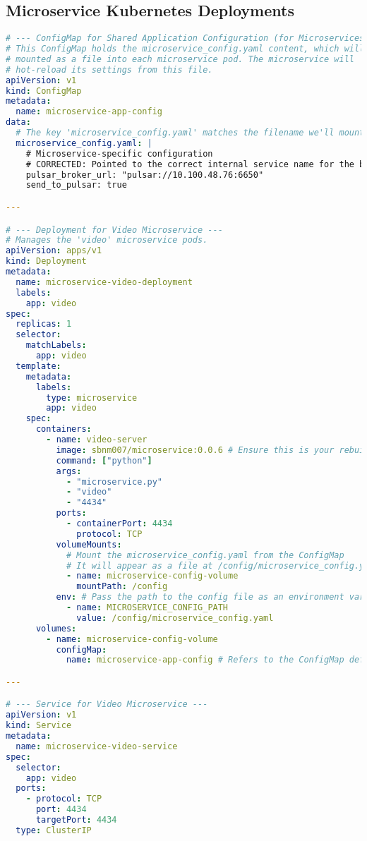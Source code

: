 \subsection{Microservice Kubernetes Deployments}
\begin{lstlisting}[breaklines=true, caption={Microservice Kubernetes Deployments}, language=yaml]
# --- ConfigMap for Shared Application Configuration (for Microservices) ---
# This ConfigMap holds the microservice_config.yaml content, which will be
# mounted as a file into each microservice pod. The microservice will
# hot-reload its settings from this file.
apiVersion: v1
kind: ConfigMap
metadata:
  name: microservice-app-config
data:
  # The key 'microservice_config.yaml' matches the filename we'll mount.
  microservice_config.yaml: |
    # Microservice-specific configuration
    # CORRECTED: Pointed to the correct internal service name for the broker.
    pulsar_broker_url: "pulsar://10.100.48.76:6650"
    send_to_pulsar: true 

---

# --- Deployment for Video Microservice ---
# Manages the 'video' microservice pods.
apiVersion: apps/v1
kind: Deployment
metadata:
  name: microservice-video-deployment
  labels:
    app: video
spec:
  replicas: 1
  selector:
    matchLabels:
      app: video
  template:
    metadata:
      labels:
        type: microservice
        app: video
    spec:
      containers:
        - name: video-server
          image: sbnm007/microservice:0.0.6 # Ensure this is your rebuilt image
          command: ["python"]
          args:
            - "microservice.py"
            - "video"
            - "4434"
          ports:
            - containerPort: 4434
              protocol: TCP
          volumeMounts:
            # Mount the microservice_config.yaml from the ConfigMap
            # It will appear as a file at /config/microservice_config.yaml inside the container.
            - name: microservice-config-volume
              mountPath: /config
          env: # Pass the path to the config file as an environment variable
            - name: MICROSERVICE_CONFIG_PATH
              value: /config/microservice_config.yaml
      volumes:
        - name: microservice-config-volume
          configMap:
            name: microservice-app-config # Refers to the ConfigMap defined above

---

# --- Service for Video Microservice ---
apiVersion: v1
kind: Service
metadata:
  name: microservice-video-service
spec:
  selector:
    app: video
  ports:
    - protocol: TCP
      port: 4434
      targetPort: 4434
  type: ClusterIP


\end{lstlisting}

